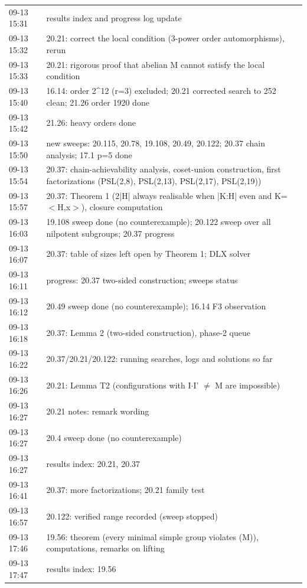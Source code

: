\begin{longtable}{lp{12.5cm}}
09-13 15:31 & results index and progress log update \\
09-13 15:32 & 20.21: correct the local condition (3-power order automorphisms), rerun \\
09-13 15:33 & 20.21: rigorous proof that abelian M cannot satisfy the local condition \\
09-13 15:40 & 16.14: order 2\^{}12 (r=3) excluded; 20.21 corrected search to 252 clean; 21.26 order 1920 done \\
09-13 15:42 & 21.26: heavy orders done \\
09-13 15:50 & new sweeps: 20.115, 20.78, 19.108, 20.49, 20.122; 20.37 chain analysis; 17.1 p=5 done \\
09-13 15:54 & 20.37: chain-achievability analysis, coset-union construction, first factorizations (PSL(2,8), PSL(2,13), PSL(2,17), PSL(2,19)) \\
09-13 15:57 & 20.37: Theorem 1 (2|H| always realisable when |K:H| even and K=$<$H,x$>$), closure computation \\
09-13 16:03 & 19.108 sweep done (no counterexample); 20.122 sweep over all nilpotent subgroups; 20.37 progress \\
09-13 16:07 & 20.37: table of sizes left open by Theorem 1; DLX solver \\
09-13 16:11 & progress: 20.37 two-sided construction; sweeps status \\
09-13 16:12 & 20.49 sweep done (no counterexample); 16.14 F3 observation \\
09-13 16:18 & 20.37: Lemma 2 (two-sided construction), phase-2 queue \\
09-13 16:22 & 20.37/20.21/20.122: running searches, logs and solutions so far \\
09-13 16:26 & 20.21: Lemma T2 (configurations with I$\cdot$I' $\ne$ M are impossible) \\
09-13 16:27 & 20.21 notes: remark wording \\
09-13 16:27 & 20.4 sweep done (no counterexample) \\
09-13 16:27 & results index: 20.21, 20.37 \\
09-13 16:41 & 20.37: more factorizations; 20.21 family test \\
09-13 16:57 & 20.122: verified range recorded (sweep stopped) \\
09-13 17:46 & 19.56: theorem (every minimal simple group violates (M)), computations, remarks on lifting \\
09-13 17:47 & results index: 19.56 \\

\end{longtable}
